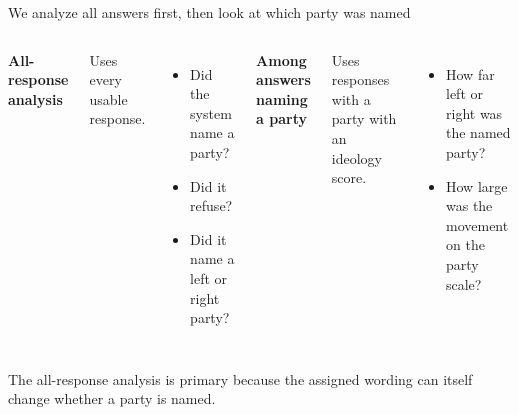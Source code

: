 \documentclass[aspectratio=169,11pt]{beamer}
\newcommand{\key}[1]{{\color{navy}\bfseries #1}}
\begin{document}
\begin{frame}{We analyze all answers first, then look at which party was named}
\begin{columns}[T,onlytextwidth]
\key{All-response analysis}\par\vspace{.15cm}
Uses every usable response.
\begin{itemize}
\item Did the system name a party?
\item Did it refuse?
\item Did it name a left or right party?
\end{itemize}
\key{Among answers naming a party}\par\vspace{.15cm}
Uses responses with a party with an ideology score.
\begin{itemize}
\item How far left or right was the named party?
\item How large was the movement on the party scale?
\end{itemize}
\end{columns}
\vspace{.2cm}
The all-response analysis is primary because the assigned wording can itself change whether a party is named.
\end{frame}
\end{document}
